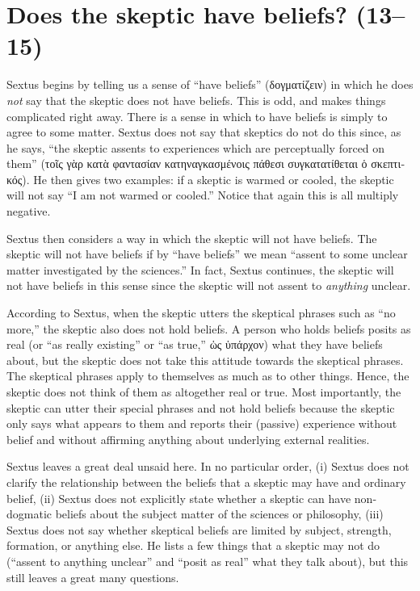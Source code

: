 \section{Does the skeptic have beliefs? (13--15)}

Sextus begins by telling us a sense of ``have beliefs'' (\textgreek{δογματίζειν}) in which he does \textit{not} say that the skeptic does not have beliefs. This is odd, and makes things complicated right away. There is a sense in which to have beliefs is simply to agree to some matter. Sextus does not say that skeptics do not do this since, as he says, ``the skeptic assents to experiences which are perceptually forced on them'' (\textgreek{τοῖς γὰρ κατὰ φαντασίαν κατηναγκασμένοις πάθεσι συγκατατίθεται ὁ σκεπτικός}). He then gives two examples: if a skeptic is warmed or cooled, the skeptic will not say ``I am not warmed or cooled.'' Notice that again this is all multiply negative. 

Sextus then considers a way in which the skeptic will not have beliefs. The skeptic will not have beliefs if by ``have beliefs'' we mean ``assent to some unclear matter investigated by the sciences.'' In fact, Sextus continues, the skeptic will not have beliefs in this sense since the skeptic will not assent to \textit{anything} unclear.

According to Sextus, when the skeptic utters the skeptical phrases such as ``no more,'' the skeptic also does not hold beliefs. A person who holds beliefs posits as real (or ``as really existing'' or ``as true,'' \textgreek{ὡς ὑπάρχον}) what they have beliefs about, but the skeptic does not take this attitude towards the skeptical phrases. The skeptical phrases apply to themselves as much as to other things. Hence, the skeptic does not think of them as altogether real or true. Most importantly, the skeptic can utter their special phrases and not hold beliefs because the skeptic only says what appears to them and reports their (passive) experience without belief and without affirming anything about underlying external realities.

Sextus leaves a great deal unsaid here. In no particular order, (i) Sextus does not clarify the relationship between the beliefs that a skeptic may have and ordinary belief, (ii) Sextus does not explicitly state whether a skeptic can have non-dogmatic beliefs about the subject matter of the sciences or philosophy, (iii) Sextus does not say whether skeptical beliefs are limited by subject, strength, formation, or anything else. He lists a few things that a skeptic may not do (``assent to anything unclear'' and ``posit as real'' what they talk about), but this still leaves a great many questions.

